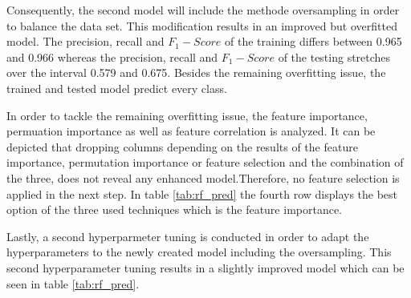 Consequently, the second model will include the methode oversampling in order to balance the data set. This modification results in an improved but overfitted model. The precision, recall and $F_1-Score$ of the training differs between 0.965 and 0.966 whereas the precision, recall and $F_1-Score$ of the testing stretches over the interval 0.579 and 0.675. Besides the remaining overfitting issue, the trained and tested model predict every class.

In order to tackle the remaining overfitting issue, the feature importance, permuation importance as well as feature correlation is analyzed.\citep{Piotri2020} It can be depicted that dropping columns depending on the results of the feature importance, permutation importance or feature selection and the combination of the three, does not reveal any enhanced model.Therefore, no feature selection is applied in the next step. In table \ref{tab:rf_pred} the fourth row displays the best option of the three used techniques which is the feature importance.

Lastly, a second hyperparmeter tuning is conducted in order to adapt the hyperparameters to the newly created model including the oversampling. This second hyperparameter tuning results in a slightly improved model which can be seen in table \ref{tab:rf_pred}.




